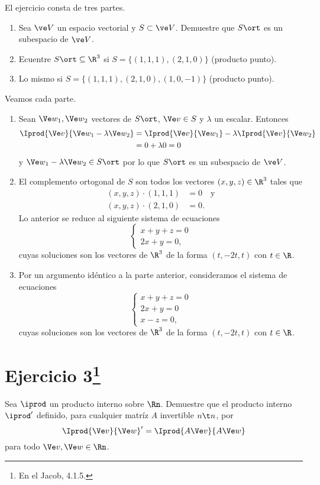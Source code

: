 El ejercicio consta de tres partes.
\begin{enumerate}
	\item Sea $\ve V$ un espacio vectorial y $S\subset\ve V$. Demuestre que $S\ort$ es un subespacio de $\ve V$.
	\item Ecuentre $S\ort\subseteq\R^3$ si $S=\{ (1,1,1),(2,1,0) \}$ (producto punto).
	\item Lo mismo si $S=\{ (1,1,1),(2,1,0),(1,0,-1) \}$ (producto punto).
\end{enumerate}
\begin{sol}
	Veamos cada parte.
	\begin{enumerate}
		\item Sean $\Ve w_1,\Ve w_2$ vectores de $ S\ort$, $\Ve v\in S$ y $\lambda$ un escalar. Entonces
		\begin{align*}
			\Iprod{\Ve v}{\Ve w_1-\lambda \Ve w_2} &= \Iprod{\Ve v}{\Ve w_1} - \lambda\Iprod{\Ve v}{\Ve w_2} \\
												   &= 0+\lambda 0 = 0
		\end{align*}
		y $\Ve w_1-\lambda \Ve w_2\in S\ort$ por lo que $S\ort$ es un subespacio de $\ve V$.
		
		\item El complemento ortogonal de $S$ son todos los vectores $(x,y,z)\in\R^3$ tales que
		\begin{align*}
			(x,y,z)\cdot(1,1,1) &= 0\quad\text{y} \\
			(x,y,z)\cdot(2,1,0) &= 0.
		\end{align*}
		Lo anterior se reduce al siguiente sistema de ecuaciones
		\[ \begin{cases}
		x+y+z = 0 \\
		2x+y=0,
		\end{cases} \]
		cuyas soluciones son los vectores de $\R^3$ de la forma $(t,-2t,t)$ con $t\in\R$.
		
		\item Por un argumento idéntico a la parte anterior, consideramos el sistema de ecuaciones
		\[ \begin{cases}
		x+y+z=0 \\
		2x+y=0 \\
		x-z=0,
		\end{cases} \]
		cuyas soluciones son los vectores de $\R^3$ de la forma $(t,-2t,t)$ con $t\in\R$.
	\end{enumerate}
\end{sol}

\section*{Ejercicio 3\footnote{En el Jacob, 4.1.5.}}
Sea $\iprod$ un producto interno sobre $\Rn$. Demuestre que el producto interno $\iprod'$ definido, para cualquier matríz $A$ invertible $n\t n$, por
\[ \Iprod{\Ve v}{\Ve w}'=\Iprod{A\Ve v}{A\Ve w} \]
para todo $\Ve v,\Ve w\in\Rn$.

